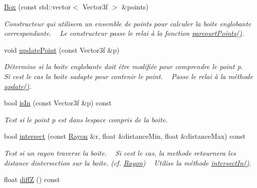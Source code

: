 \begin{DoxyCompactItemize}
\item 
\hyperlink{class_box_a2353559b5ce40e7edcc85daddd86f292}{Box} (const std\+::vector$<$ Vector3f $>$ \&points)
\begin{DoxyCompactList}\small\item\em Constructeur qui utilisera un ensemble de points pour calculer la boite englobante correspondante. ~\newline
Le constructeur passe le relai à la fonction \hyperlink{class_box_a8ffb517da2017677041941e1b2f60f1f}{parcourt\+Points()}. \end{DoxyCompactList}\item 
void \hyperlink{class_box_ad4ee0fca654414f2f9f5092f70ab92e7}{update\+Point} (const Vector3f \&p)
\begin{DoxyCompactList}\small\item\em Détermine si la boite englobante doit être modifiée pour comprendre le point {\itshape p}. ~\newline
Si c\textquotesingle{}est le cas la boite s\textquotesingle{}adapte pour contenir le point. ~\newline
Passe le relai à la méthode \hyperlink{class_box_a13162f123f21923c3b22ba02a2211143}{update()}. \end{DoxyCompactList}\item 
bool \hyperlink{class_box_a2d6c41818d3d77ba71866528f5e6ccac}{is\+In} (const Vector3f \&p) const 
\begin{DoxyCompactList}\small\item\em Test si le point {\itshape p} est dans l\textquotesingle{}espace compris de la boite. \end{DoxyCompactList}\item 
bool \hyperlink{class_box_a6ce97deba91479b4fa66c260c1a37c8a}{intersect} (const \hyperlink{class_rayon}{Rayon} \&r, float \&distance\+Min, float \&distance\+Max) const 
\begin{DoxyCompactList}\small\item\em Test si un rayon traverse la boite. ~\newline
Si c\textquotesingle{}est le cas, la methode retournera les distance d\textquotesingle{}intersection sur la boite. (cf. \hyperlink{class_rayon}{Rayon}) ~\newline
Utilise la méthode \hyperlink{class_box_a54e436e7e487b4a9c75eaf342d430b64}{intersect\+In()}. \end{DoxyCompactList}\item 
float \hyperlink{class_box_a173e401890b2cb5af0ba69d78c9df413}{diff\+Z} () const 

\end{DoxyCompactItemize}
